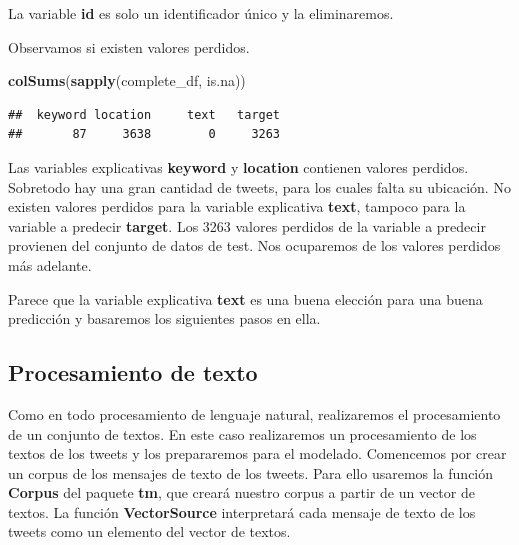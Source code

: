 \documentclass[
]{article}
\newenvironment{Shaded}{\begin{snugshade}}{\end{snugshade}}
\newcommand{\KeywordTok}[1]{\textcolor[rgb]{0.13,0.29,0.53}{\textbf{#1}}}
\newcommand{\NormalTok}[1]{#1}
\newcommand{\OperatorTok}[1]{\textcolor[rgb]{0.81,0.36,0.00}{\textbf{#1}}}
\newcommand{\OtherTok}[1]{\textcolor[rgb]{0.56,0.35,0.01}{#1}}
\newcommand{\StringTok}[1]{\textcolor[rgb]{0.31,0.60,0.02}{#1}}
\begin{document}
La variable \textbf{id} es solo un identificador único y la
eliminaremos.

\begin{Shaded}
\end{Shaded}

Observamos si existen valores perdidos.

\begin{Shaded}
\begin{Highlighting}[]
\KeywordTok{colSums}\NormalTok{(}\KeywordTok{sapply}\NormalTok{(complete_df, is.na))}
\end{Highlighting}
\end{Shaded}

\begin{verbatim}
##  keyword location     text   target 
##       87     3638        0     3263
\end{verbatim}

Las variables explicativas \textbf{keyword} y \textbf{location}
contienen valores perdidos. Sobretodo hay una gran cantidad de tweets,
para los cuales falta su ubicación. No existen valores perdidos para la
variable explicativa \textbf{text}, tampoco para la variable a predecir
\textbf{target}. Los 3263 valores perdidos de la variable a predecir
provienen del conjunto de datos de test. Nos ocuparemos de los valores
perdidos más adelante.

Parece que la variable explicativa \textbf{text} es una buena elección
para una buena predicción y basaremos los siguientes pasos en ella.

\hypertarget{procesamiento-de-texto}{%
\subsection{Procesamiento de texto}\label{procesamiento-de-texto}}

Como en todo procesamiento de lenguaje natural, realizaremos el
procesamiento de un conjunto de textos. En este caso realizaremos un
procesamiento de los textos de los tweets y los prepararemos para el
modelado. Comencemos por crear un corpus de los mensajes de texto de los
tweets. Para ello usaremos la función \textbf{Corpus} del paquete
\textbf{tm}, que creará nuestro corpus a partir de un vector de textos.
La función \textbf{VectorSource} interpretará cada mensaje de texto de
los tweets como un elemento del vector de textos.
\end{document}
